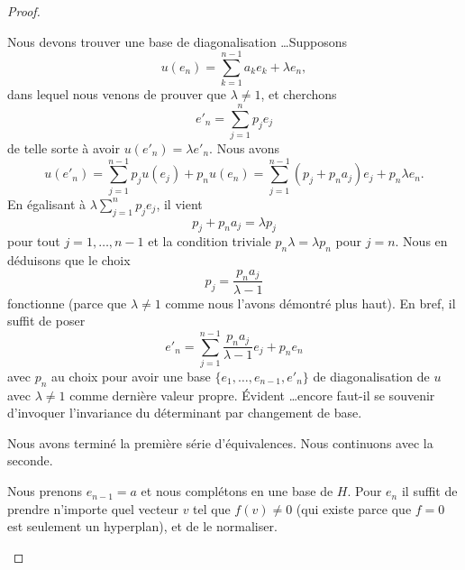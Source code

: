 \begin{proof}
\begin{subproof}
		Nous devons trouver une base de diagonalisation \ldots Supposons
		\begin{equation}
			u(e_n)=\sum_{k=1}^{n-1}a_ke_k+\lambda e_n,
		\end{equation}
		dans lequel nous venons de prouver que \( \lambda\neq 1\), et cherchons
		\begin{equation}
			e'_n=\sum_{j=1}^np_je_j
		\end{equation}
		de telle sorte à avoir \( u(e'_n)=\lambda e'_n\). Nous avons
		\begin{equation}
			u(e'_n)=\sum_{j=1}^{n-1}p_ju(e_j)+p_nu(e_n) =\sum_{j=1}^{n-1}(p_j+p_na_j)e_j+p_n\lambda e_n.
		\end{equation}
		En égalisant à \( \lambda\sum_{j=1}^np_je_j\), il vient
		\begin{equation}
			p_j+p_na_j=\lambda p_j
		\end{equation}
		pour tout \( j=1,\ldots, n-1\) et la condition triviale \( p_n\lambda=\lambda p_n\) pour \( j=n\). Nous en déduisons que le choix
		\begin{equation}
			p_j=\frac{ p_na_j }{ \lambda-1 }
		\end{equation}
		fonctionne (parce que \( \lambda\neq 1\) comme nous l'avons démontré plus haut). En bref, il suffit de poser
		\begin{equation}
			e'_n=\sum_{j=1}^{n-1}\frac{ p_na_j }{ \lambda-1 }e_j+p_ne_n
		\end{equation}
		avec \( p_n\) au choix pour avoir une base \( \{ e_1,\ldots, e_{n-1},e'_n \}\) de diagonalisation de \( u\) avec \( \lambda\neq 1\) comme dernière valeur propre.
		 Évident \ldots encore faut-il se souvenir d'invoquer l'invariance du déterminant par changement de base.
	\end{subproof}
	Nous avons terminé la première série d'équivalences. Nous continuons avec la seconde.
	\begin{subproof}
		Nous prenons \( e_{n-1}=a\) et nous complétons en une base de \( H\). Pour \( e_n\) il suffit de prendre n'importe quel vecteur \( v\) tel que \( f(v)\neq 0\) (qui existe parce que \( f=0\) est seulement un hyperplan), et de le normaliser.


\end{subproof}
\end{proof}
